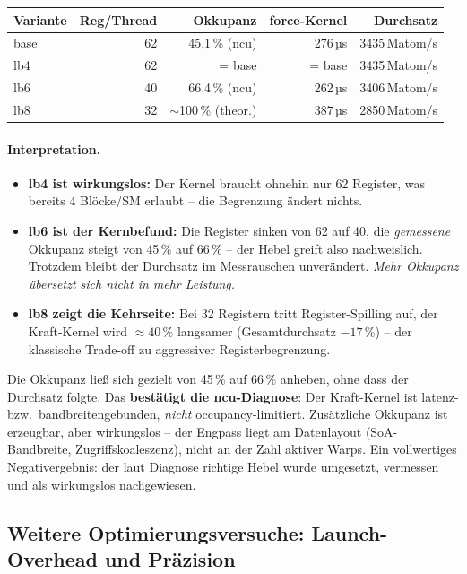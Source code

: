 \documentclass[11pt,a4paper]{article}
\newcommand{\infobox}[2]{%
  \begin{tcolorbox}[colback=orange!5,colframe=orange!60!black,boxrule=0.4pt,
                    arc=2pt,title={\small\textbf{#1}}]
    \small #2
  \end{tcolorbox}%
}
\begin{document}
\begin{center}\small
\begin{tabular}{@{}lrrrr@{}}
\toprule
Variante & Reg/Thread & Okkupanz & force-Kernel & Durchsatz \\
\midrule
base & 62 & 45{,}1\,\% (ncu) & 276\,µs & 3435\,Matom/s \\
lb4  & 62 & = base          & = base  & 3435\,Matom/s \\
lb6  & 40 & 66{,}4\,\% (ncu) & 262\,µs & 3406\,Matom/s \\
lb8  & 32 & $\sim$100\,\% (theor.) & 387\,µs & 2850\,Matom/s \\
\bottomrule
\end{tabular}
\end{center}

\paragraph{Interpretation.}
\begin{itemize}[itemsep=2pt]
\item \textbf{lb4 ist wirkungslos:} Der Kernel braucht ohnehin nur 62 Register,
  was bereits 4 Blöcke/SM erlaubt -- die Begrenzung ändert nichts.
\item \textbf{lb6 ist der Kernbefund:} Die Register sinken von 62 auf 40, die
  \emph{gemessene} Okkupanz steigt von 45\,\% auf 66\,\% -- der Hebel greift
  also nachweislich. Trotzdem bleibt der Durchsatz im Messrauschen unverändert.
  \emph{Mehr Okkupanz übersetzt sich nicht in mehr Leistung.}
\item \textbf{lb8 zeigt die Kehrseite:} Bei 32 Registern tritt Register-Spilling
  auf, der Kraft-Kernel wird $\approx 40\,\%$ langsamer (Gesamtdurchsatz $-17\,\%$)
  -- der klassische Trade-off zu aggressiver Registerbegrenzung.
\end{itemize}

\infobox{Diagnose experimentell bestätigt}{%
  Die Okkupanz ließ sich gezielt von 45\,\% auf 66\,\% anheben, ohne dass der
  Durchsatz folgte. Das \textbf{bestätigt die ncu-Diagnose}: Der Kraft-Kernel
  ist latenz- bzw.\ bandbreitengebunden, \emph{nicht} occupancy-limitiert.
  Zusätzliche Okkupanz ist erzeugbar, aber wirkungslos -- der Engpass liegt
  am Datenlayout (SoA-Bandbreite, Zugriffskoaleszenz), nicht an der Zahl
  aktiver Warps. Ein vollwertiges Negativergebnis: der laut Diagnose richtige
  Hebel wurde umgesetzt, vermessen und als wirkungslos nachgewiesen.
}

\FloatBarrier
\subsection{Weitere Optimierungsversuche: Launch-Overhead und Präzision}
\label{sec:cudaopt}
\end{document}
